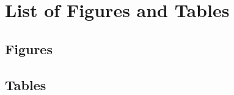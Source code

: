 \cleardoublepage


\chapter*{List of Figures and Tables}
{}

\section*{Figures}
\makeatletter
{}
\makeatother

\vspace{2em}

\section*{Tables}
\makeatletter
{}
\makeatother

\cleardoublepage
